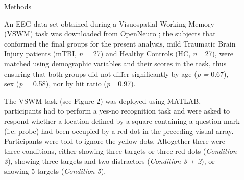 \documentclass[final]{beamer}
\newlength{\sepwidth}
\newlength{\colwidth}
\newcommand{\separatorcolumn}{\begin{column}{\sepwidth}\end{column}}
\begin{document}
\begin{frame}[t]
\begin{columns}[t]
\begin{column}{\colwidth}

\end{column}

\separatorcolumn

\begin{column}{\colwidth}

  \begin{block}{Methods}


  An EEG data set obtained during a Visuospatial Working Memory (VSWM) task was downloaded from OpenNeuro \citep{ds003523}; the subjects that conformed the final groups for the present analysis, mild Traumatic Brain Injury patients (mTBI, \textit{n = }27) and Healthy Controls (HC, \textit{n =}27), were matched using demographic variables and their scores in the task, thus ensuring that both groups did not differ significantly by age (\textit{p =} 0.67), sex (\textit{p =} 0.58), nor by hit ratio (\textit{p= }0.97).
    

     The VSWM task (see Figure 2) was deployed using MATLAB, participants had to perform a yes-no recognition task and were asked to respond whether a location defined by a square containing a question mark (i.e. probe) had been occupied by a red dot in the preceding visual array. Participants were told to ignore the yellow dots. Altogether there were three conditions, either showing three targets or three red dots (\textit{Condition 3}), showing three targets and two distractors (\textit{Condition 3 + 2}), or showing 5 targets (\textit{Condition 5}).


\end{block}
\end{column}
\end{columns}
\end{frame}
\end{document}
